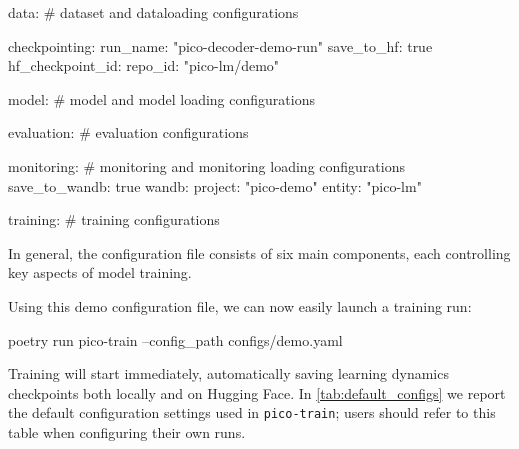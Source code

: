 \begin{center}
    \begin{configlisting}
        data:
            # dataset and dataloading configurations

        checkpointing:
            run_name: "pico-decoder-demo-run"
            save_to_hf: true
            hf_checkpoint_id:
                repo_id: "pico-lm/demo"
        
        model:
            # model and model loading configurations

        evaluation:
            # evaluation configurations

        monitoring:
            # monitoring and monitoring loading configurations
            save_to_wandb: true
            wandb:
                project: "pico-demo"
                entity: "pico-lm"
            
        training:
            # training configurations
    \end{configlisting}
\end{center}

In general, the configuration file consists of six main components, each controlling key aspects of model training. 

Using this demo configuration file, we can now easily launch a training run:

\begin{center}
    \begin{codelisting}
        poetry run pico-train --config_path configs/demo.yaml
    \end{codelisting}
\end{center}

Training will start immediately, automatically saving learning dynamics checkpoints both locally and on Hugging Face. In \cref{tab:default_configs} we report the default configuration settings used in \texttt{pico-train}; users should refer to this table when configuring their own runs.

